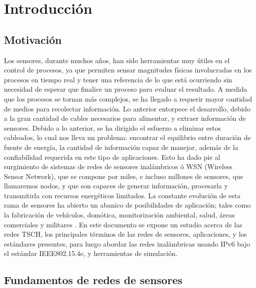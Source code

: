 \chapter[Introducción]{Introducción}
\label{ch:intro}

\section{Motivación}
Los sensores, durante muchos años, han sido herramientas muy útiles en el control de procesos, ya que permiten sensar magnitudes físicas involucradas en los procesos en tiempo real y tener una referencia de lo que está ocurriendo sin necesidad de esperar que finalice un proceso para evaluar el resultado. A medida que los procesos se tornan más complejos, se ha llegado a requerir mayor cantidad de medios para recolectar información. Lo anterior entorpece el desarrollo, debido a la gran cantidad de cables necesarios para alimentar, y extraer información de sensores. Debido a lo anterior, se ha dirigido el  esfuerzo a eliminar estos cableados, lo cual nos lleva un problema: encontrar el equilibrio entre duración de fuente de energía, la cantidad de información capaz de manejar, además de la confiabilidad requerida en este tipo de aplicaciones. Esto ha dado pie al surgimiento de sistemas de redes de sensores inalámbricos ó WSN (Wireless Sensor Network), que se compone por miles, e incluso millones de sensores, que llamaremos nodos, y que son capaces de generar información, procesarla y transmitirla con recursos energéticos limitados. La constante evolución de esta rama de sensores ha abierto un abanico de posibilidades de aplicación; tales como la fabricación de vehículos, domótica, monitorización ambiental, salud, áreas comerciales y militares \cite{crow1997ieee}. En este documento se expone un estudio acerca de las redes TSCH, los principales términos de las redes de sensores, aplicaciones, y los estándares presentes, para luego abordar las redes inalámbricas usando IPv6 bajo el estándar IEEE802.15.4e, y herramientas de simulación.

\section{Fundamentos de redes de sensores}

